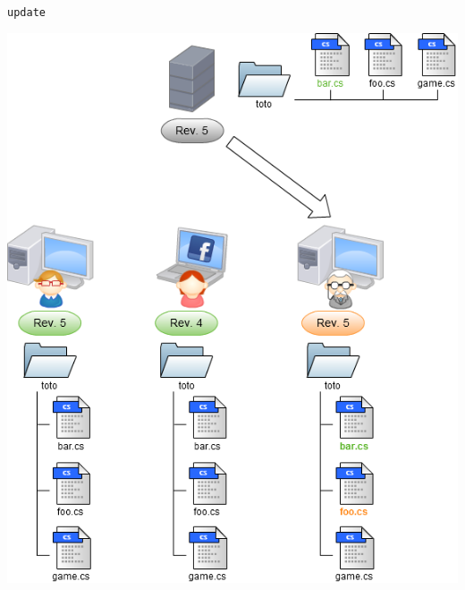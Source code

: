 \begin{frame}
  \texttt{update}
  \begin{center}
    \vspace{-12pt}
    \includegraphics[scale=0.3]{images/5-Update.png}
  \end{center}
\end{frame}

